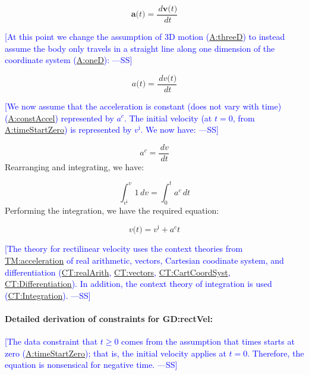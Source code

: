 \documentclass[12pt]{article}
\newcommand{\authornote}[3]{\textcolor{#1}{[#3 ---#2]}}
\newcommand{\authornote}[3]{}
\newcommand{\wss}[1]{\authornote{blue}{SS}{#1}}
\begin{document}
$$\symbf{a}\text{(}t\text{)}=\frac{\,d\symbf{v}\text{(}t\text{)}}{\,dt}$$

\wss{At this point we change the assumption of 3D motion
(\hyperref[threeD]{A:threeD}) to instead assume the body only travels in a
straight line along one dimension of the coordinate system
(\hyperref[oneD]{A:oneD}):}

$${a}\text{(}t\text{)}=\frac{\,d{v}\text{(}t\text{)}}{\,dt}$$

\wss{We now assume that the acceleration is constant (does not vary with time)
(\hyperref[constAccel]{A:constAccel}) represented by ${a^{c}}$. The initial
velocity (at $t=0$, from \hyperref[timeStartZero]{A:timeStartZero}) is
represented by ${v^{\text{i}}}$. We now have:}

\begin{displaymath}
{a^{c}}=\frac{\,dv}{\,dt}
\end{displaymath}
Rearranging and integrating, we have:

\begin{displaymath}
\int_{{v^{\text{i}}}}^{v}{1}\,dv=\int_{0}^{t}{{a^{c}}}\,dt
\end{displaymath}
Performing the integration, we have the required equation:

\begin{displaymath}
v\text{(}t\text{)}={v^{\text{i}}}+{a^{c}} t
\end{displaymath}

\wss{The theory for rectilinear velocity uses the context theories from
\hyperref[TM:acceleration]{TM:acceleration} of real arithmetic, vectors,
Cartesian coodinate system, and differentiation
(\hyperref[CT:realArith]{CT:realArith}, \hyperref[CT:vectors]{CT:vectors},
\hyperref[CT:CartCoordSyst]{CT:CartCoordSyst},
\hyperref[CT:Differentiation]{CT:Differentiation}).  In addition, the context
theory of integration is used (\hyperref[CT:Integration]{CT:Integration}).}

\paragraph{Detailed derivation of constraints for GD:rectVel:}

\wss{The data constraint that $t \geq 0$ comes from the assumption that times
starts at zero (\hyperref[timeStartZero]{A:timeStartZero}); that is, the initial
velocity applies at $t=0$.  Therefore, the equation is nonsensical for
negative time.}
~\\
\end{document}
